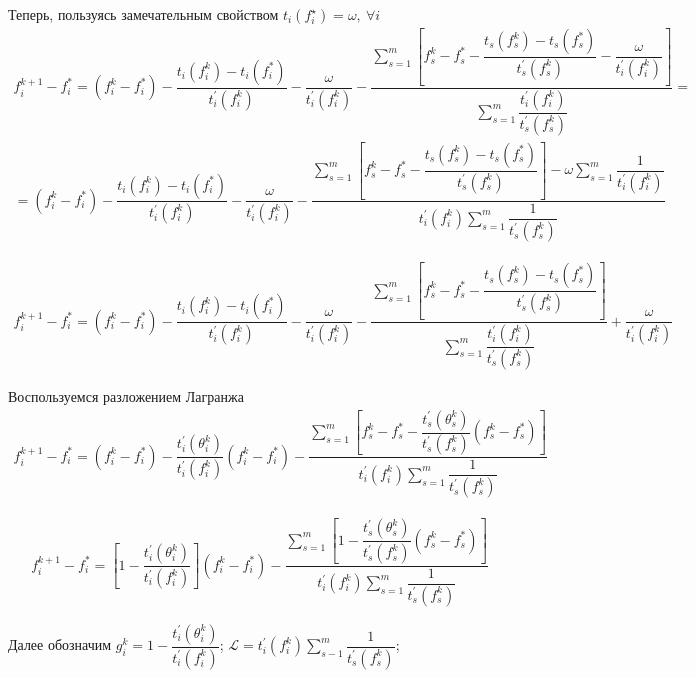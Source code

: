 \documentclass[12pt,a4paper,titlepage,oneside]{book}
\theoremstyle{definition}
\theoremstyle{plain}
\theoremstyle{remark}
\theoremstyle{remark}
\theoremstyle{plain}
\theoremstyle{plain}
\begin{document}
Теперь, пользуясь замечательным свойством $ t_i(f_i^\star)=\omega, \: \forall i $\\
\begin{multline*}
f_i^{k+1}-f_i^*=(f_i^k-f_i^*)-\dfrac{t_i(f_i^k)-t_i(f_i^*)}{t_i^{\prime} (f_i^k)} - \dfrac{\omega}{t_i^{\prime} (f_i^k)}- \dfrac{\sum \limits_{s=1}^m \left[ f_s^k-f_s^*-\dfrac{t_s(f_s^k)-t_s(f_s^*)}{t_s^{\prime} (f_s^k)}-\dfrac{\omega}{t_i^{\prime} (f_i^k)} \right]}{\sum \limits_{s=1}^m \dfrac{t_i^{\prime} (f_i^k)}{t_s^{\prime} (f_s^k)}}=\\
=(f_i^k-f_i^*)-\dfrac{t_i(f_i^k)-t_i(f_i^*)}{t_i^{\prime} (f_i^k)} - \dfrac{\omega}{t_i^{\prime} (f_i^k)}- \dfrac{\sum \limits_{s=1}^m \left[ f_s^k-f_s^*-\dfrac{t_s(f_s^k)-t_s(f_s^*)}{t_s^{\prime} (f_s^k)}\right ]-\omega \sum \limits_{s=1}^m\dfrac{1}{t_i^{\prime} (f_i^k)} }{t_i^{\prime} (f_i^k)\sum \limits_{s=1}^m \dfrac{1}{t_s^{\prime} (f_s^k)}}
\end{multline*}

\begin{multline*}
f_i^{k+1}-f_i^*=(f_i^k-f_i^*)-\dfrac{t_i(f_i^k)-t_i(f_i^*)}{t_i^{\prime} (f_i^k)} - \dfrac{\omega}{t_i^{\prime} (f_i^k)}- \dfrac{\sum \limits_{s=1}^m \left[ f_s^k-f_s^*-\dfrac{t_s(f_s^k)-t_s(f_s^*)}{t_s^{\prime} (f_s^k)}\right ] }{\sum \limits_{s=1}^m \dfrac{t_i^{\prime} (f_i^k)}{t_s^{\prime} (f_s^k)}}+\dfrac{\omega}{t_i^{\prime} (f_i^k)}
\end{multline*}

Воспользуемся разложением Лагранжа
\begin{align*}
f_i^{k+1}-f_i^*=(f_i^k-f_i^*)-\dfrac{t_i^{\prime} (\theta_i^k)}{t_i^{\prime} (f_i^k)}(f_i^k-f_i^*) - \dfrac{\sum \limits_{s=1}^m \left[ f_s^k-f_s^*-
\dfrac{t_s^{\prime} (\theta_s^k)}{t_s^{\prime} (f_s^k)}(f_s^k-f_s^*)\right ] }
{t_i^{\prime} (f_i^k)\sum \limits_{s=1}^m \dfrac{1}{t_s^{\prime} (f_s^k)}}
\end{align*} 


\begin{align*}
f_i^{k+1}-f_i^*=\left[1-\dfrac{t_i^{\prime} (\theta_i^k)}{t_i^{\prime} (f_i^k)} \right](f_i^k-f_i^*)- \dfrac{\sum \limits_{s=1}^m \left[1-
\dfrac{t_s^{\prime} (\theta_s^k)}{t_s^{\prime} (f_s^k)}(f_s^k-f_s^*)\right ] }
{t_i^{\prime} (f_i^k)\sum \limits_{s=1}^m \dfrac{1}{t_s^{\prime} (f_s^k)}}
\end{align*} 

Далее обозначим $g_i^k=1-\dfrac{t_i^{\prime} (\theta_i^k)}{t_i^{\prime} (f_i^k)}$;
$ \mathscr{L}=t_i^{\prime}(f_i^k) \sum \limits_{s-1}^m \dfrac{1}{t_s^{\prime} (f_s^k)} $;
\end{document}
